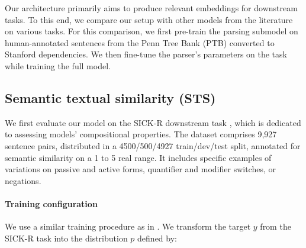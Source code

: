 Our architecture primarily aims to produce relevant embeddings for downstream tasks. To this end, we compare our setup with other models from the literature on various tasks. For this comparison, we first pre-train the parsing submodel on human-annotated sentences from the Penn Tree Bank (PTB) \parencite{marcus_94} converted to Stanford dependencies. We then fine-tune the parser's parameters on the task while training the full model.


\subsection{Semantic textual similarity (STS)}
\label{sec:sts}

We first evaluate our model on the SICK-R downstream task \parencite{marelli_14}, which is dedicated to assessing models' compositional properties. 
The dataset comprises 9,927 sentence pairs, distributed in a 4500/500/4927 train/dev/test split, annotated for semantic similarity on a 1 to 5 real range. It includes specific examples of variations on passive and active forms, quantifier and modifier switches, or negations. 

\paragraph{Training configuration}

We use a similar training procedure
as in \textcite{tai_15}. We transform the target $y$ from the SICK-R task into the distribution $p$ defined by:

